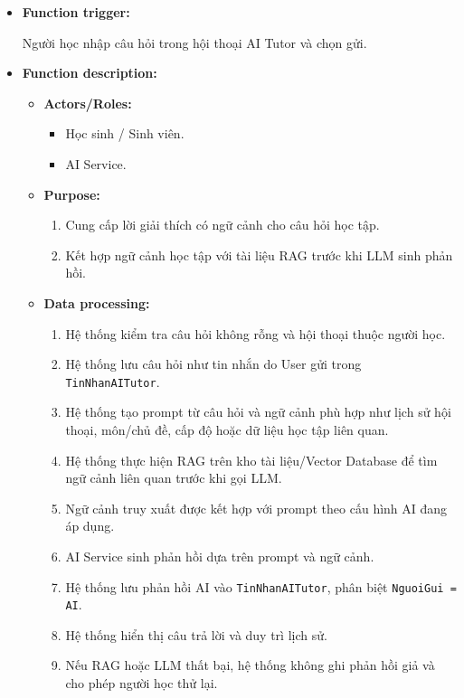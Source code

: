 \documentclass[12pt,a4paper,oneside]{report}
\begin{document}
\begin{itemize}

    \item \textbf{Function trigger:}

    Người học nhập câu hỏi trong hội thoại AI Tutor và chọn gửi.

    \item \textbf{Function description:}

    \begin{itemize}

        \item \textbf{Actors/Roles:}
        \begin{itemize}
            \item Học sinh / Sinh viên.
            \item AI Service.
        \end{itemize}

        \item \textbf{Purpose:}
        \begin{enumerate}
            \item Cung cấp lời giải thích có ngữ cảnh cho câu hỏi học tập.
            \item Kết hợp ngữ cảnh học tập với tài liệu RAG trước khi LLM sinh phản hồi.
        \end{enumerate}

        \item \textbf{Data processing:}
        \begin{enumerate}
            \item Hệ thống kiểm tra câu hỏi không rỗng và hội thoại thuộc người học.
            \item Hệ thống lưu câu hỏi như tin nhắn do User gửi trong \texttt{TinNhanAITutor}.
            \item Hệ thống tạo prompt từ câu hỏi và ngữ cảnh phù hợp như lịch sử hội thoại, môn/chủ đề, cấp độ hoặc dữ liệu học tập liên quan.
            \item Hệ thống thực hiện RAG trên kho tài liệu/Vector Database để tìm ngữ cảnh liên quan trước khi gọi LLM.
            \item Ngữ cảnh truy xuất được kết hợp với prompt theo cấu hình AI đang áp dụng.
            \item AI Service sinh phản hồi dựa trên prompt và ngữ cảnh.
            \item Hệ thống lưu phản hồi AI vào \texttt{TinNhanAITutor}, phân biệt \texttt{NguoiGui = AI}.
            \item Hệ thống hiển thị câu trả lời và duy trì lịch sử.
            \item Nếu RAG hoặc LLM thất bại, hệ thống không ghi phản hồi giả và cho phép người học thử lại.
        \end{enumerate}


\end{itemize}
\end{itemize}
\end{document}

